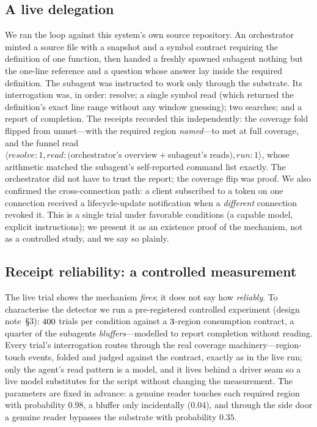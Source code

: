 \documentclass[10pt,twocolumn]{article}
\begin{document}
\subsection{A live delegation}
\label{sec:live}
We ran the loop against this system's own source repository. An
orchestrator minted a source file with a snapshot and a symbol contract
requiring the definition of one function, then handed a freshly spawned
subagent nothing but the one-line reference and a question whose answer lay
inside the required definition. The subagent was instructed to work only
through the substrate. Its interrogation was, in order: resolve; a single
symbol read (which returned the definition's exact line range without any
window guessing); two searches; and a report of completion. The receipts
recorded this independently: the coverage fold flipped from unmet---with
the required region \emph{named}---to met at full coverage, and the funnel
read $\langle\textit{resolve}{:}1, \textit{read}{:}\text{(orchestrator's
overview}+\text{subagent's reads)}, \textit{run}{:}1\rangle$, whose
arithmetic matched the subagent's self-reported command list exactly. The
orchestrator did not have to trust the report; the coverage flip was
proof. We also confirmed the cross-connection path: a client subscribed to
a token on one connection received a lifecycle-update notification when a
\emph{different} connection revoked it. This is a single trial under
favorable conditions (a capable model, explicit instructions); we present
it as an existence proof of the mechanism, not as a controlled study, and
we say so plainly.

\subsection{Receipt reliability: a controlled measurement}
\label{sec:tier2}

The live trial shows the mechanism \emph{fires}; it does not say how
\emph{reliably}. To characterise the detector we run a pre-registered
controlled experiment (design note~\S3): $400$ trials per
condition against a $3$-region consumption contract, a
quarter of the subagents \emph{bluffers}---modelled to report completion
without reading. Every trial's interrogation routes through the real
coverage machinery---region-touch events, folded and judged against the
contract, exactly as in the live run; only the agent's read pattern is a
model, and it lives behind a driver seam so a live model substitutes for the
script without changing the measurement. The parameters are fixed in
advance: a genuine reader touches each required region with probability
$0.98$, a bluffer only incidentally ($0.04$), and through the side door a
genuine reader bypasses the substrate with probability $0.35$.
\end{document}
